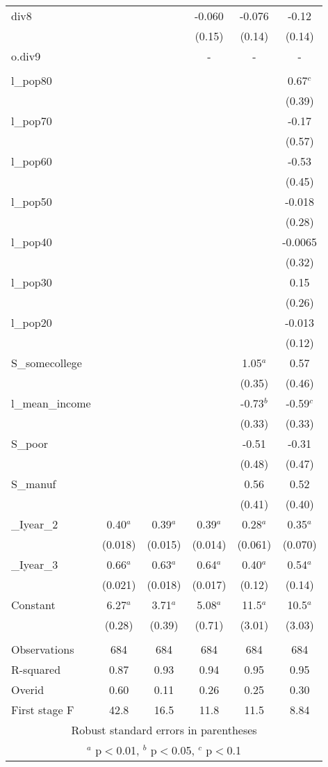 \documentclass[]{article}
\begin{document}
\begin{tabular}{lccccc}
div8 &  &  & -0.060 & -0.076 & -0.12 \\
 &  &  & (0.15) & (0.14) & (0.14) \\
o.div9 &  &  & - & - & - \\
 &  &  &  &  &  \\
l\_pop80 &  &  &  &  & 0.67$^c$ \\
 &  &  &  &  & (0.39) \\
l\_pop70 &  &  &  &  & -0.17 \\
 &  &  &  &  & (0.57) \\
l\_pop60 &  &  &  &  & -0.53 \\
 &  &  &  &  & (0.45) \\
l\_pop50 &  &  &  &  & -0.018 \\
 &  &  &  &  & (0.28) \\
l\_pop40 &  &  &  &  & -0.0065 \\
 &  &  &  &  & (0.32) \\
l\_pop30 &  &  &  &  & 0.15 \\
 &  &  &  &  & (0.26) \\
l\_pop20 &  &  &  &  & -0.013 \\
 &  &  &  &  & (0.12) \\
S\_somecollege &  &  &  & 1.05$^a$ & 0.57 \\
 &  &  &  & (0.35) & (0.46) \\
l\_mean\_income &  &  &  & -0.73$^b$ & -0.59$^c$ \\
 &  &  &  & (0.33) & (0.33) \\
S\_poor &  &  &  & -0.51 & -0.31 \\
 &  &  &  & (0.48) & (0.47) \\
S\_manuf &  &  &  & 0.56 & 0.52 \\
 &  &  &  & (0.41) & (0.40) \\
\_Iyear\_2 & 0.40$^a$ & 0.39$^a$ & 0.39$^a$ & 0.28$^a$ & 0.35$^a$ \\
 & (0.018) & (0.015) & (0.014) & (0.061) & (0.070) \\
\_Iyear\_3 & 0.66$^a$ & 0.63$^a$ & 0.64$^a$ & 0.40$^a$ & 0.54$^a$ \\
 & (0.021) & (0.018) & (0.017) & (0.12) & (0.14) \\
Constant & 6.27$^a$ & 3.71$^a$ & 5.08$^a$ & 11.5$^a$ & 10.5$^a$ \\
 & (0.28) & (0.39) & (0.71) & (3.01) & (3.03) \\
 &  &  &  &  &  \\
Observations & 684 & 684 & 684 & 684 & 684 \\
R-squared & 0.87 & 0.93 & 0.94 & 0.95 & 0.95 \\
Overid & 0.60 & 0.11 & 0.26 & 0.25 & 0.30 \\
 First stage F & 42.8 & 16.5 & 11.8 & 11.5 & 8.84 \\ \hline
\multicolumn{6}{c}{ Robust standard errors in parentheses} \\
\multicolumn{6}{c}{ $^a$ p$<$0.01, $^b$ p$<$0.05, $^c$ p$<$0.1} \\
\end{tabular}
\end{document}
